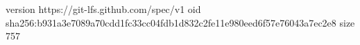 version https://git-lfs.github.com/spec/v1
oid sha256:b931a3e7089a70cdd1fc33cc04fdb1d832c2fe11e980eed6f57e76043a7ec2e8
size 757
